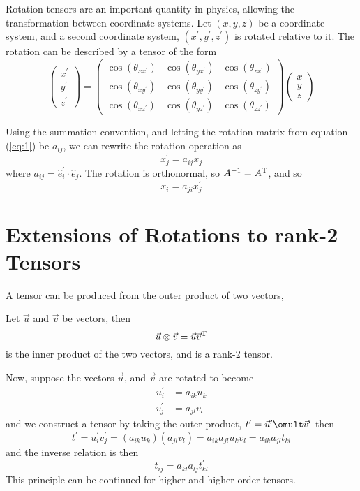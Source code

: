 Rotation tensors are an important quantity in physics, allowing the
transformation between coordinate systems.  Let $(x,y,z)$ be a
coordinate system, and a second coordinate system, $(x^{\prime},
y^{\prime}, z^{\prime})$ is rotated relative to it. The rotation can
be described by a tensor of the form
\begin{equation}
  \label{eq:1}
  \begin{pmatrix}
    x^{\prime} \\ y^{\prime} \\ z^{\prime}
  \end{pmatrix} = 
  \begin{pmatrix}
    \cos(\theta_{xx^{\prime}}) & \cos(\theta_{yx^{\prime}}) & \cos(\theta_{zx^{\prime}})\\
    \cos(\theta_{xy^{\prime}}) & \cos(\theta_{yy^{\prime}}) & \cos(\theta_{zy^{\prime}})\\
    \cos(\theta_{xz^{\prime}}) & \cos(\theta_{yz^{\prime}}) & \cos(\theta_{zz^{\prime}})
  \end{pmatrix}
  \begin{pmatrix}
    x \\ y \\ z
  \end{pmatrix}
\end{equation}

Using the summation convention, and letting the rotation matrix from
equation (\ref{eq:1}) be $a_{ij}$, we can rewrite the rotation
operation as
\[ x_j^{\prime} = a_{ij} x_j \] where $a_{ij} = \hat{e}_i^{\prime}
\cdot \hat{e}_j$.
The rotation is orthonormal, so $A^{-1} = A^{\rm T}$, and so
\[ x_i = a_{ji} x_j^{\prime} \]

\section{Extensions of Rotations to rank-2 Tensors}
\label{sec:extens-rotat-rank}

A tensor can be produced from the outer product of two vectors,

\begin{definition}
\label{def:outerproduct}
Let $\vec{u}$ and $\vec{v}$ be vectors, then
\[ \vec{u} \otimes \vec{v} = \vec{u} \vec{v}^{\rm T} \] is the inner
product of the two vectors, and is a rank-2 tensor.
\end{definition}

Now, suppose the vectors $\vec{u}$, and $\vec{v}$ are rotated to become
\begin{align*}
  u_i^{\prime} &= a_{ik} u_k \\
  v_j^{\prime} &= a_{jl} v_l
\end{align*}
and we construct a tensor by taking the outer product,
$t^{\prime} = \vec{u}^{\prime} \omult \vec{v}^{\prime}$
then
\[ t^{\prime} = u_i^{\prime} v_j^{\prime} = (a_{ik} u_k)(a_{jl} v_l) =
a_{ik} a_{jl} u_k v_l = a_{ik} a_{jl} t_{kl} \]
and the inverse relation is then
\[ t_{ij} = a_{kl} a_{lj} t^{\prime}_{kl} \] This principle can be
continued for higher and higher order tensors.

